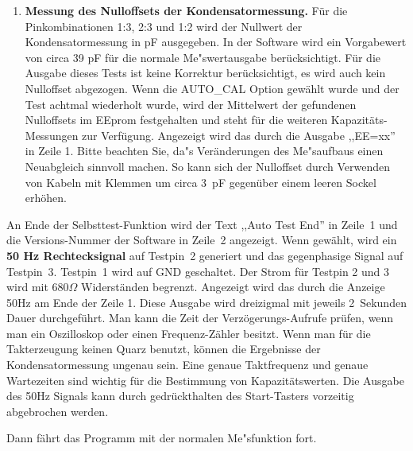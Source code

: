 \begin{enumerate}
\item {\bf Messung des Nulloffsets der Kondensatormessung.}
F\"ur die Pinkombinationen 1:3, 2:3 und 1:2 wird der Nullwert der Kondensatormessung in pF ausgegeben.
In der Software wird ein Vorgabewert von circa 39 pF f\"ur die normale Me"swertausgabe ber\"ucksichtigt.
F\"ur die Ausgabe dieses Tests ist keine Korrektur ber\"ucksichtigt, es wird auch kein Nulloffset abgezogen.
Wenn die AUTO\_CAL Option gew\"ahlt wurde und der Test achtmal wiederholt wurde, wird der Mittelwert
der gefundenen Nulloffsets im EEprom festgehalten und steht f\"ur die weiteren Kapazit\"ats-Messungen zur Verf\"ugung.
Angezeigt wird das durch die Ausgabe ,,EE=xx''  in Zeile 1.
Bitte beachten Sie, da"s Ver\"anderungen des Me"saufbaus einen Neuabgleich sinnvoll machen.
So kann sich der Nulloffset durch Verwenden von Kabeln mit Klemmen um circa 3~pF gegen\"uber einem leeren
Sockel erh\"ohen.

\end{enumerate}

An Ende der Selbsttest-Funktion wird der Text ,,Auto Test End'' in Zeile~1 und die Versions-Nummer der Software in Zeile~2 angezeigt.
Wenn gew\"ahlt, wird ein {\bf 50 Hz Rechtecksignal} auf Testpin~2 generiert und das gegenphasige Signal auf Testpin~3.
Testpin~1 wird auf GND geschaltet. Der Strom f\"ur Testpin 2 und 3 wird mit \(680\Omega\) Widerst\"anden begrenzt.
Angezeigt wird das durch die Anzeige 50Hz am Ende der Zeile 1.
Diese Ausgabe wird dreizigmal mit jeweils 2~Sekunden Dauer durchgef\"uhrt.
Man kann die Zeit der Verz\"ogerungs-Aufrufe pr\"ufen, wenn man ein Oszilloskop oder einen
Frequenz-Z\"ahler besitzt.
Wenn man f\"ur die Takterzeugung keinen Quarz benutzt, k\"onnen die
Ergebnisse der Kondensatormessung ungenau sein.
Eine genaue Taktfrequenz und genaue Wartezeiten sind wichtig f\"ur die Bestimmung von Kapazit\"atswerten.
Die Ausgabe des 50Hz Signals kann durch gedr\"uckthalten des Start-Tasters vorzeitig abgebrochen werden.

Dann f\"ahrt das Programm mit der normalen Me"sfunktion fort.

